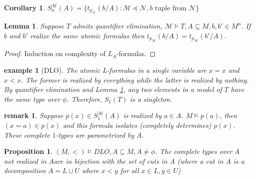 \documentclass[letterpaper, 12pt]{article}
\newcommand{\fin}{\qquad \quad \hfill \framebox[1.75mm][l]{\,}}
\newcommand{\cM}{\mathcal{M}}
\newcommand{\cN}{\mathcal{N}}
\theoremstyle{stdthm}
\newtheorem{lem}[thm]{Lemma}
\newtheorem{cor}[thm]{Corollary}
\newtheorem{prop}[thm]{Proposition}
\theoremstyle{stddef}
\newtheorem{rem}[thm]{remark} %
\newtheorem{eg}[thm]{example} %
\theoremstyle{stdnonum}
\theoremstyle{stdqands}
\theoremstyle{stdbold}
\begin{document}
\begin{cor}
$S_n^{\cM} (A) = \{t_{p_\cN}(b/A): \cM \preceq \cN, b \mbox{ tuple from } \cN \}$ 
\end{cor}

\begin{lem} \label{propeg}
Suppose $T$ admits quantifier elimination, $\cM \models T, A \subseteq M, b,b' \in M^n$. If $b$ and $b'$ realize the same atomic formulas  then $t_{p_\cM}(b /A) = t_{p_\cM}(b'/A)$. 
\end{lem}

\begin{proof}
Induction on complexity of $L_A$-formulas. 
\end{proof}

\begin{eg} [DLO] The atomic L-formulas in a single variable are $x=x$ and $x<x$. The former is realized by everything while the latter is realized by nothing. By quantifier elimination and Lemma \ref{propeg}, any two elements in a model of $T$ have the same type over $\phi$. Therefore, $S_1(T)$ is a singleton. 

\end{eg}

\begin{rem}
Suppose $p(x) \in S_1^\cM(A)$ is realized by $a \in A$. $M \models p(a)$, then $(x=a) \in p(x)$ and this formula isolates (completely determines) $p(x)$. These complete $1$-types are parametrized by $A$. 
\end{rem}


\begin{prop}
$(M,<) \models DLO, A\subseteq M, A \neq \phi$. The complete types over $A$ not realized in $A$are in bijection with the set of \emph{cuts} in $A$ (where a \emph{cut} in $A$ is a decomposition $A = L \sqcup U$ where $x<y$ for all $x \in L, y \in U$)  
\end{prop}
\end{document}

